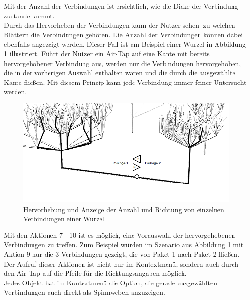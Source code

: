 \noindent Mit der Anzahl der Verbindungen ist ersichtlich, wie die Dicke der Verbindung zustande kommt.\\

\noindent Durch das Hervorheben der Verbindungen kann der Nutzer sehen, zu welchen Blättern die Verbindungen gehören. Die Anzahl der Verbindungen können dabei ebenfalls angezeigt werden. Dieser Fall ist am Beispiel einer Wurzel in Abbildung \ref{fig:root-interaction} illustriert. Führt der Nutzer ein Air-Tap auf eine Kante mit bereits hervorgehobener Verbindung aus, werden nur die Verbindungen hervorgehoben, die in der vorherigen Auswahl enthalten waren und die durch die ausgewählte Kante fließen. Mit diesem Prinzip kann jede Verbindung immer feiner Untersucht werden.\\

\begin{figure}[htb]
  \includegraphics[width=\textwidth]{figures/root-interaction}
  \caption{Hervorhebung und Anzeige der Anzahl und Richtung von einzelnen Verbindungen einer Wurzel}
  \label{fig:root-interaction}
\end{figure}

\noindent Mit den Aktionen 7 - 10 ist es möglich, eine Vorauswahl der hervorgehobenen Verbindungen zu treffen. Zum Beispiel würden im Szenario aus Abbildung \ref{fig:root-interaction} mit Aktion 9 nur die 3 Verbindungen gezeigt, die von Paket 1 nach Paket 2 fließen. Der Aufruf dieser Aktionen ist nicht nur im Kontextmenü, sondern auch durch den Air-Tap auf die Pfeile für die Richtungsangaben möglich. \\

\noindent Jedes Objekt hat im Kontextmenü die Option, die gerade ausgewählten Verbindungen auch direkt als Spinnweben anzuzeigen.\\

